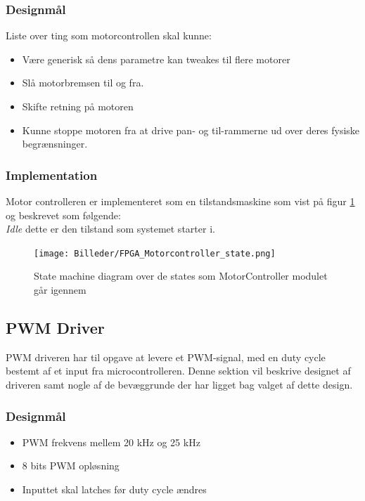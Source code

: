 \subsubsection{Designmål}
Liste over ting som motorcontrollen skal kunne:
\begin{itemize}
	\item Være generisk så dens parametre kan tweakes til flere motorer
	\item Slå motorbremsen til og fra.
	\item Skifte retning på motoren
	\item Kunne stoppe motoren fra at drive pan- og til-rammerne ud over deres fysiske begrænsninger.
\end{itemize}

\subsubsection{Implementation}
Motor controlleren er implementeret som en tilstandsmaskine som vist på figur \ref{fig:FPGA_MotorController_State} og beskrevet som følgende:\\
\textit{Idle} dette er den tilstand som systemet starter i.

\begin{figure}[ht]
	\begin{center}
		\texttt{[image: Billeder/FPGA\_Motorcontroller\_state.png]}
	\end{center}
\caption{State machine diagram over de states som MotorController modulet går igennem}
\label{fig:FPGA_MotorController_State}
\end{figure}

\subsection{PWM Driver}

PWM driveren har til opgave at levere et PWM-signal, med en duty cycle bestemt af et input fra microcontrolleren. Denne sektion vil beskrive designet af driveren samt nogle af de bevæggrunde der har ligget bag valget af dette design.

\subsubsection{Designmål}

\begin{itemize}

\item PWM frekvens mellem 20 kHz og 25 kHz
\item 8 bits PWM opløsning
\item Inputtet skal latches før duty cycle ændres

\end{itemize}

